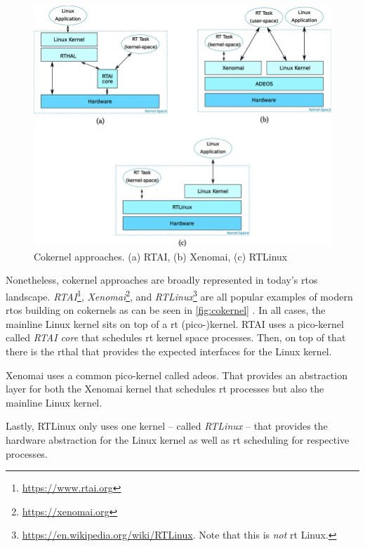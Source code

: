 \documentclass[10pt,twocolumn,a4paper]{article}
\begin{document}
\begin{figure}[hbt]
  \centering
  \includegraphics[scale=.26, clip]{assets/cokernel.png}
  \caption{Cokernel approaches. (a) RTAI, (b) Xenomai, (c) RTLinux \cite{reghenzani_realtime_2019} \label{fig:cokernel}}
\end{figure}
Nonetheless, cokernel approaches are broadly represented in today's \acrshort{rtos} landscape.
\emph{RTAI}\footnote{\url{https://www.rtai.org}}, \emph{Xenomai}\footnote{\url{https://xenomai.org}}, and \emph{RTLinux}\footnote{\url{https://en.wikipedia.org/wiki/RTLinux}. Note that this is \emph{not} \acrlong{rt} Linux.} are all popular examples of modern \acrshort{rtos} building on cokernels as can be seen in \autoref{fig:cokernel} \cite{reghenzani_realtime_2019}.
In all cases, the mainline Linux kernel sits on top of a \acrshort{rt} (pico-)kernel.
RTAI uses a pico-kernel called \emph{RTAI core} that schedules \acrshort{rt} kernel space processes.
Then, on top of that there is the \acrfull{rthal} that provides the expected interfaces for the Linux kernel.

Xenomai uses a common pico-kernel called \acrfull{adeos}.
That provides an abstraction layer for both the Xenomai kernel that schedules \acrshort{rt} processes but also the mainline Linux kernel.

Lastly, RTLinux only uses one kernel -- called \emph{RTLinux} -- that provides the hardware abstraction for the Linux kernel as well as \acrshort{rt} scheduling for respective processes.
\newline
\end{document}
